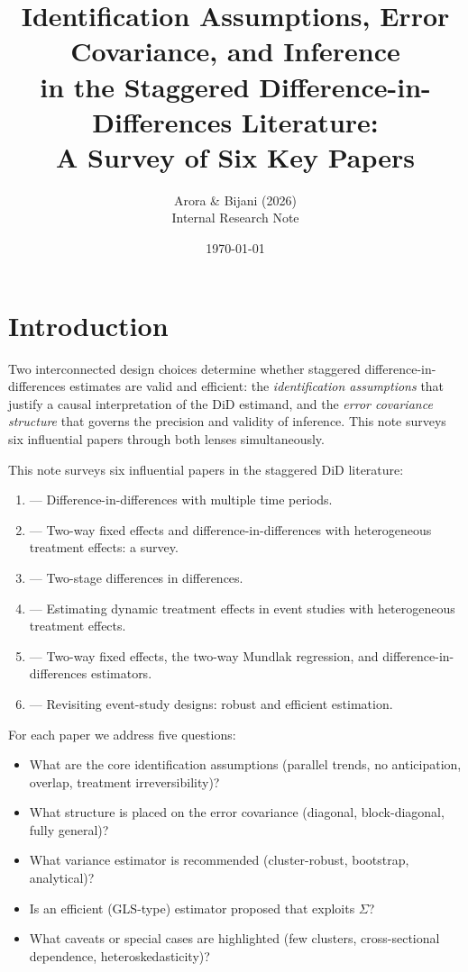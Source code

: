 \documentclass[12pt]{article}
\title{Identification Assumptions, Error Covariance, and Inference\\
       in the Staggered Difference-in-Differences Literature:\\
       A Survey of Six Key Papers}
\author{Arora \& Bijani (2026)\\
        \small{Internal Research Note}}
\date{\today}
\begin{document}
\maketitle
\tableofcontents
\newpage

\section{Introduction}

Two interconnected design choices determine whether staggered
difference-in-differences estimates are valid and efficient:
the \textit{identification assumptions} that justify a causal interpretation
of the DiD estimand, and the \textit{error covariance structure} that governs
the precision and validity of inference.
This note surveys six influential papers through both lenses simultaneously.

This note surveys six influential papers in the staggered DiD literature:

\begin{enumerate}
  \item \citet{callaway2021difference} --- Difference-in-differences with multiple
        time periods.
  \item \citet{dechaisemartin2023twoway} --- Two-way fixed effects and
        difference-in-differences with heterogeneous treatment effects: a survey.
  \item \citet{gardner2024twostage} --- Two-stage differences in differences.
  \item \citet{sun2021estimating} --- Estimating dynamic treatment effects in event
        studies with heterogeneous treatment effects.
  \item \citet{wooldridge2025twoway} --- Two-way fixed effects, the two-way Mundlak
        regression, and difference-in-differences estimators.
  \item \citet{borusyak2024revisiting} --- Revisiting event-study designs: robust
        and efficient estimation.
\end{enumerate}

For each paper we address five questions:
\begin{itemize}
  \item What are the core identification assumptions (parallel trends, no
        anticipation, overlap, treatment irreversibility)?
  \item What structure is placed on the error covariance (diagonal,
        block-diagonal, fully general)?
  \item What variance estimator is recommended (cluster-robust, bootstrap,
        analytical)?
  \item Is an efficient (GLS-type) estimator proposed that exploits $\Sigma$?
  \item What caveats or special cases are highlighted (few clusters,
        cross-sectional dependence, heteroskedasticity)?
\end{itemize}
\end{document}
